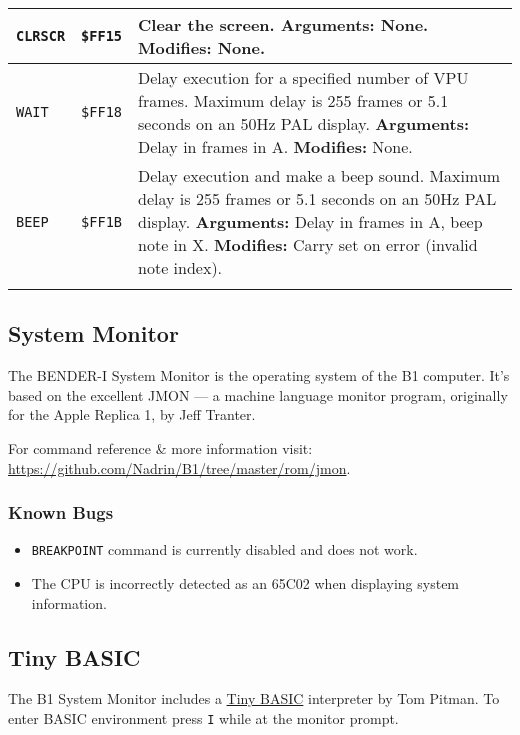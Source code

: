 \documentclass[a4paper,10pt,oneside]{article}
\begin{document}
\begin{tabularx}{\textwidth}{l | l | X }
  \texttt{CLRSCR} & \texttt{\$FF15} &
  Clear the screen.
  \newline \textbf{Arguments:} None.
  \newline \textbf{Modifies:} None. \\ \hline

  \texttt{WAIT} & \texttt{\$FF18} &
  Delay execution for a specified number of VPU frames.
  \newline Maximum delay is 255 frames or 5.1 seconds on an 50Hz PAL display.
  \newline \textbf{Arguments:} Delay in frames in A.
  \newline \textbf{Modifies:} None. \\ \hline

  \texttt{BEEP} & \texttt{\$FF1B} &
  Delay execution and make a beep sound.
  \newline Maximum delay is 255 frames or 5.1 seconds on an 50Hz PAL display.
  \newline \textbf{Arguments:} Delay in frames in A, beep note in X.
  \newline \textbf{Modifies:} Carry set on error (invalid note index). \\

  \caption{BIOS functions}
\end{tabularx}

\subsection{System Monitor}
The BENDER-I System Monitor is the operating system of the B1 computer. It's based on the excellent JMON --- a machine language monitor program, originally for the Apple Replica 1, by Jeff Tranter.

For command reference \& more information visit: \url{https://github.com/Nadrin/B1/tree/master/rom/jmon}.

\subsubsection*{Known Bugs}
\begin{itemize}
  \item \texttt{BREAKPOINT} command is currently disabled and does not work.
  \item The CPU is incorrectly detected as an 65C02 when displaying system information.
\end{itemize}

\subsection{Tiny BASIC}
The B1 System Monitor includes a \href{http://en.wikipedia.org/wiki/Tiny_BASIC}{Tiny BASIC} interpreter by Tom Pitman. To enter BASIC environment press \texttt{I} while at the monitor prompt.
\end{document}
